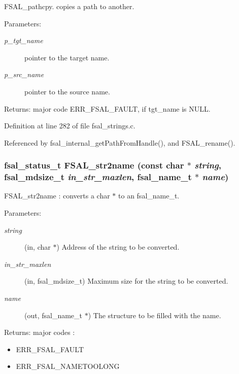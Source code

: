 FSAL\_\-pathcpy. copies a path to another.

\begin{Desc}
\item[Parameters:]
\begin{description}
\item[{\em p\_\-tgt\_\-name}]pointer to the target name. \item[{\em p\_\-src\_\-name}]pointer to the source name. \end{description}
\end{Desc}
\begin{Desc}
\item[Returns:]major code ERR\_\-FSAL\_\-FAULT, if tgt\_\-name is NULL. \end{Desc}


Definition at line 282 of file fsal\_\-strings.c.

Referenced by fsal\_\-internal\_\-getPathFromHandle(), and FSAL\_\-rename().
\subsubsection[{FSAL\_\-str2name}]{\setlength{\rightskip}{0pt plus 5cm}fsal\_\-status\_\-t FSAL\_\-str2name (const char $\ast$ {\em string}, \/  fsal\_\-mdsize\_\-t {\em in\_\-str\_\-maxlen}, \/  fsal\_\-name\_\-t $\ast$ {\em name})}\label{group__FSALNameFunctions_gc4feea8f73f08361426af099c6f3b9c8}


FSAL\_\-str2name : converts a char $\ast$ to an fsal\_\-name\_\-t.

\begin{Desc}
\item[Parameters:]
\begin{description}
\item[{\em string}](in, char $\ast$) Address of the string to be converted. \item[{\em in\_\-str\_\-maxlen}](in, fsal\_\-mdsize\_\-t) Maximum size for the string to be converted. \item[{\em name}](out, fsal\_\-name\_\-t $\ast$) The structure to be filled with the name.\end{description}
\end{Desc}
\begin{Desc}
\item[Returns:]major codes :\begin{itemize}
\item ERR\_\-FSAL\_\-FAULT\item ERR\_\-FSAL\_\-NAMETOOLONG \end{itemize}
\end{Desc}


